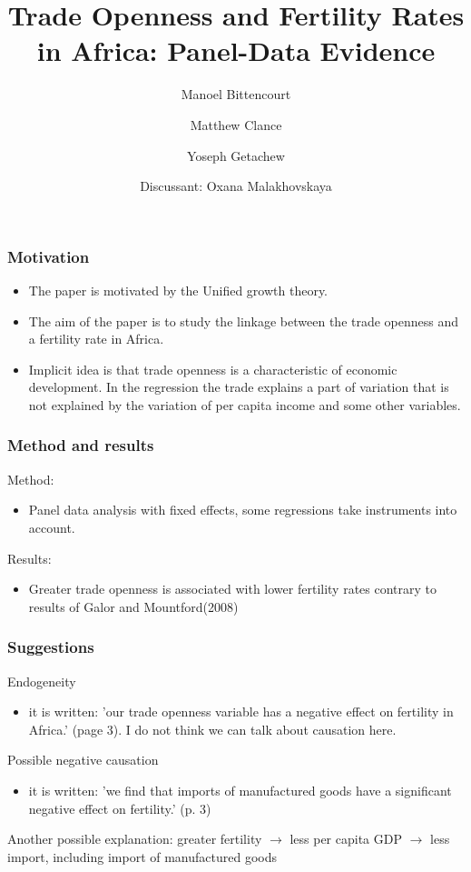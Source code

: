 \documentclass{beamer} %
\author[Discussion]{Manoel Bittencourt\and Matthew Clance \and Yoseph Getachew }
\title[Trade openness and fertility rates]{Trade Openness and Fertility Rates in Africa: Panel-Data Evidence}
\date{Discussant: Oxana Malakhovskaya}
\begin{document}
\begin{frame} %

\titlepage

\end{frame}

\begin{frame}
\frametitle{Motivation}

\begin{itemize}
\item The paper is motivated by the Unified growth theory.
\item The aim of the paper is  to study the linkage between the trade openness and a fertility rate in Africa.
\item Implicit idea is that trade openness is a characteristic of economic development. In the regression the trade explains a part of variation that is not explained by the variation of per capita income and some other variables.
\end{itemize}
\end{frame}

\begin{frame}
\frametitle{Method and results}

Method:
\begin{itemize}
\item Panel data analysis with fixed effects, some regressions take instruments into account.
\end{itemize}

Results: 
\begin{itemize}
\item Greater trade openness is associated with lower fertility rates contrary to results of Galor and Mountford(2008)
\end{itemize}
\end{frame}


\begin{frame}
\frametitle{Suggestions}

Endogeneity

\begin{itemize}
\item it is written: 'our trade openness variable has a negative effect on fertility in Africa.' (page 3). I do not think we can talk about causation here. 
\end{itemize}


Possible negative causation

\begin{itemize}
\item it is written: 'we find that imports of manufactured goods have a significant negative effect on fertility.' (p. 3)
\end{itemize}

Another possible explanation: 
greater fertility $\to$ less per capita GDP $\to$ less import, including import of manufactured goods 

\end{frame}
\end{document}
